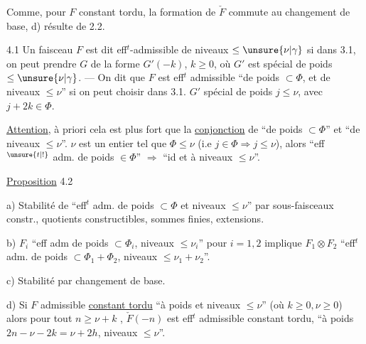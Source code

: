 Comme, pour $F$ constant tordu, la formation de $\check F$ commute au changement de base,  d) résulte de 2.2.


4.1 Un faisceau $F$ est dit eff$^{t}$-admissible de niveaux $\leq\unsure{\nu|\gamma}$ si  dans 3.1, on peut prendre $G$  de la forme $G'(-k)$, $k\geq0$, où $G'$ est spécial de poids  $\leq\unsure{\nu|\gamma}$. --- On dit que $F$ est eff$^{t}$ admissible ``de poids $\subset\Phi$, et de niveaux $\leq\nu$'' si on peut choisir dans 3.1. $G'$  spécial de poids $j\leq\nu$, avec  $j+2k\in\Phi$.


\uline{Attention}, à priori cela est plus fort que la \uline{conjonction} de ``de poids $\subset\Phi$'' et ``de niveaux $\leq\nu$''.    $\nu$ est  un entier tel que $\Phi\leq\nu$ (i.e $j\in\Phi\Rightarrow j\leq\nu$),  alors ``eff$^{\unsure{t|!}}$ adm. de poids $\in\Phi$'' $\Rightarrow$ ``id et à niveaux $\leq\nu$''.

\uline{Proposition} 4.2 

a) Stabilité de ``eff$^{t}$ adm. de poids $\subset\Phi$ et niveaux $\leq\nu$'' par sous-faisceaux constr., quotients constructibles, sommes finies, extensions.

b) $F_i$ ``eff adm de poids $\subset\Phi_i$, niveaux $\leq\nu_i$'' pour $i=1,2$ implique $F_1\otimes F_2$ ``eff$^{t}$ adm. de poids $\subset\Phi_1+\Phi_2$, niveaux $\leq\nu_1+\nu_2$''.

c) Stabilité par changement de base.

d) Si $F$  admissible \uline{constant tordu} ``à poids  et niveaux $\leq\nu$'' (où $k\geq0,\nu\geq0$)  alors pour tout $n\geq\nu+k$ , $\check F(-n)$ est eff$^{t}$ admissible constant tordu, ``à poids $2n-\nu-2k=\nu+2h$, niveaux $\leq\nu$''.

